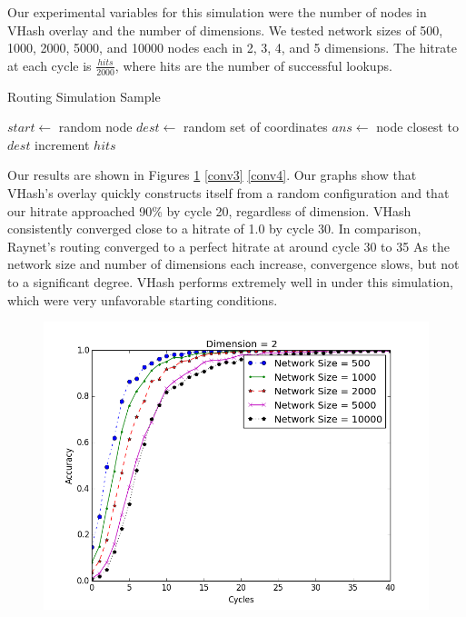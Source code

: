 \documentclass{IEEEtran}
\begin{document}
Our experimental variables for this simulation were the number of nodes in VHash overlay and the number of dimensions.  
We tested network sizes of 500, 1000, 2000, 5000, and 10000 nodes each in 2, 3, 4, and 5 dimensions.
The hitrate at each cycle is $\frac{hits}{2000}$, where hits are the number of successful lookups.

 


\begin{algorithm}
\caption{Routing Simulation Sample}
\label{routesim}
\begin{algorithmic}[1]  %
	\STATE $start \leftarrow$ random node
	\STATE $dest \leftarrow$ random set of coordinates
    \STATE $ans \leftarrow$ node closest to $dest$
    	\STATE increment $hits$
    \ENDIF
\end{algorithmic} 
\end{algorithm}



Our results are shown in Figures \ref{conv2} \ref{conv3} \ref{conv4}.
Our graphs show that VHash's overlay quickly constructs itself from a random configuration and that our hitrate approached 90\% by cycle 20, regardless of dimension.
VHash consistently converged close to a hitrate of 1.0 by cycle 30. 
In comparison, Raynet's routing converged to a perfect hitrate at around cycle 30 to 35 \cite{raynet} 
As the network size and number of dimensions each increase, convergence slows, but not to a significant degree.
VHash performs extremely well in under this simulation, which were very unfavorable starting conditions.  


\begin{figure}
	\centering
	\includegraphics[width=\linewidth]{conv_d2}
	\caption{}
	\label{conv2}
\end{figure}
\end{document}
